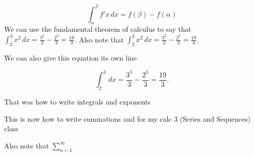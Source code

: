 \documentclass{article}
\begin{document}
\begin{equation}
	\int_\alpha^\beta f'x \, dx=f(\beta)-f(\alpha)
\end{equation}
We can use the fundamental theorem of calculus to say that 
$\int_2^3 x^2 \, dx = \frac{3^3}{3} - \frac{2^3}{3}=\frac{19}{3}$.
Also note that $\displaystyle \int_2^3 x^2 \, dx=\frac{3^3}{3}-\frac{2^3}{3}=\frac{19}{3}$.

 We can also give this equation its own line

 \[
	 \int_2^3 \, dx = \frac{3^3}{3} - \frac{2^3}{3} = \frac{19}{3}.
 \]

That was how to write integrals and exponents

This is now how to write summations and for my calc 3 (Series and Sequences) class


Also note that $\displaystyle \sum_{n=1}^\infty$
\end{document}
